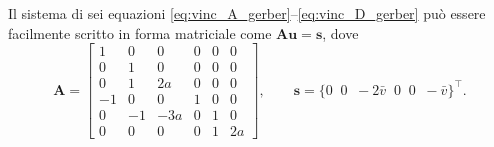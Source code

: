 %
%
%
Il sistema di sei equazioni \eqref{eq:vinc_A_gerber}--\eqref{eq:vinc_D_gerber}
può essere facilmente scritto in forma matriciale come $\bm{Au}=\bm{s}$, dove
\begin{equation}\label{eq:A_gerber_SCR}
	\bm{A} =
	\begin{bmatrix}
		1 &  0 &   0 & 0 & 0 &  0 \\
		0 &  1 &   0 & 0 & 0 &  0 \\
		0 &  1 &  2a & 0 & 0 &  0 \\
		-1 &  0 &   0 & 1 & 0 &  0 \\
		0 & -1 & -3a & 0 & 1 &  0 \\
		0 &  0 &   0 & 0 & 1 & 2a
	\end{bmatrix},
	\qquad
	\bm{s} = \bigl\{0\;\;  0 \;\; -2\bar v \;\; 0 \;\; 0 \;\; -\bar v
	\bigr\}^{\!\top}.
\end{equation}
